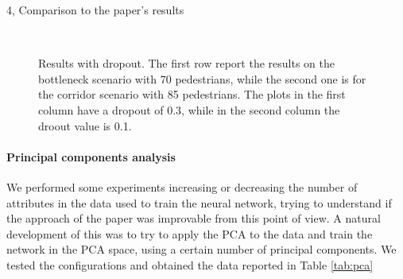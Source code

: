 \documentclass[10pt,a4paper]{article}
\begin{document}
\begin{task}{4, Comparison to the paper's results}
\begin{figure}[H]
    \centering
    \hfill
    \\
    \hfill
    \caption{Results with dropout.
    The first row report the results on the bottleneck scenario with 70 pedestrians, while the second one is for the corridor scenario with 85 pedestrians.
    The plots in the first column have a dropout of 0.3, while in the second column the droout value is 0.1.}
    \label{fig:dropout}
\end{figure}

\paragraph{Principal components analysis}
We performed some experiments increasing or decreasing the number of attributes in the data used to train the neural network, trying to understand if the approach of the paper was improvable from this point of view.
A natural development of this was to try to apply the PCA to the data and train the network in the PCA space, using a certain number of principal components.
We tested the configurations and obtained the data reported in Table \ref{tab:pca}


\end{task}
\end{document}
